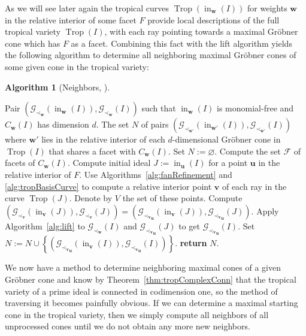 \documentclass[
  paper=a4,
  titlepage,
  bibliography=totoc,
  listof=totoc,
  pagesize=pdftex
]{scrartcl}
\numberwithin{figure}{section}
\numberwithin{equation}{section}
\numberwithin{table}{section}
\let\vec\mathbf
\DeclareMathOperator{\Trop}{Trop}
\DeclareMathOperator{\initial}{in}
\theoremstyle{definition}
\newtheorem{algo}[definition]{Algorithm}
\numberwithin{definition}{section}
\begin{document}
As we will see later again the tropical curves $\Trop(\initial_{\vec w}(I))$ for weights
$\vec w$ in the relative interior of some facet $F$ provide local descriptions of the full
tropical variety $\Trop(I)$, with each ray pointing towards a maximal Gröbner cone which
has $F$ as a facet. Combining this fact with the lift algorithm yields the following
algorithm to determine all neighboring maximal Gröbner cones of some given cone in the
tropical variety:

\begin{algo}[Neighbors, {\cite[Algorithm~4.10]{compTropVar}}]\
  \label{alg:neighbors}
  \begin{algorithmic}[1]
    \Require Pair $(\mathcal G_{\prec_{\vec w}}(\initial_{\vec w}(I)), \mathcal
      G_{\prec_{\vec w}}(I))$ such that $\initial_{\vec w}(I)$ is monomial-free and
      $C_{\vec w}(I)$ has dimension $d$.
    \Ensure The set $N$ of pairs $(\mathcal G_{\prec_{\vec w'}}(\initial_{\vec w'}(I)),
      \mathcal G_{\prec_{\vec w'}}(I))$ where $\vec w'$ lies in the relative interior of
      each $d$-dimensional Gröbner cone in $\Trop(I)$ that shares a facet with $C_{\vec
      w}(I)$.
    \State Set $N := \varnothing$.
    \State Compute the set $\mathcal F$ of facets of $C_{\vec w}(I)$.
    \For{$F \in \mathcal F$}
      \State Compute initial ideal $J := \initial_{\vec u}(I)$ for a point $\vec u$ in the
        relative interior of $F$.
      \State Use Algorithms~\ref{alg:fanRefinement} and \ref{alg:tropBasisCurve} to compute
        a relative interior point $\vec v$ of each ray in the curve $\Trop(J)$. Denote by
        $V$ the set of these points.
        \label{alg:interiorPoints}
      \For{$\vec v \in V$}
        \State Compute $(\mathcal G_{\prec_{\vec v}}(\initial_{\vec v}(J)), \mathcal
          G_{\prec_{\vec v}}(J)) = (\mathcal G_{{\prec_{\vec v}}_{\vec u}}(\initial_{\vec
          v}(J)), \mathcal G_{{\prec_{\vec v}}_{\vec u}}(J))$.
        \State Apply Algorithm~\ref{alg:lift} to $\mathcal G_{\prec_{\vec w}}(I)$ and
          $\mathcal G_{{\prec_{\vec v}}_{\vec u}}(J)$ to get $\mathcal G_{{\prec_{\vec
          v}}_{\vec u}}(I)$.
        \State Set $N := N \cup \left\{ (\mathcal G_{{\prec_{\vec v}}_{\vec
          u}}(\initial_{\vec v}(I)), \mathcal G_{{\prec_{\vec v}}_{\vec u}}(I))
          \right\}$.
      \EndFor
    \EndFor
    \State\textbf{return} $N$.
  \end{algorithmic}
\end{algo}

We now have a method to determine neighboring maximal cones of a given Gröbner cone and
know by Theorem~\ref{thm:tropComplexConn} that the tropical variety of a prime ideal is
connected in codimension one, so the method of traversing it becomes painfully obvious. If
we can determine a maximal starting cone in the tropical variety, then we simply compute
all neighbors of all unprocessed cones until we do not obtain any more new neighbors.
\end{document}
